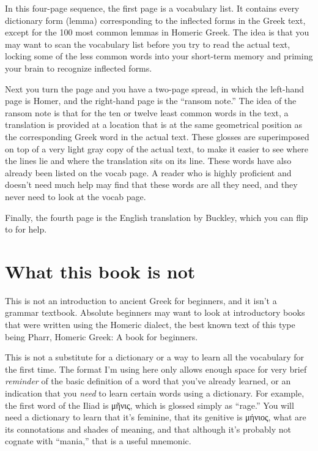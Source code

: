 {In this four-page sequence, the first page is a vocabulary list. It
contains every dictionary form (lemma) corresponding to the inflected
forms in the Greek text, except for the 100 most common lemmas in
Homeric Greek. The idea is that you may want to scan the vocabulary
list before you try to read the actual text, locking some of the less
common words into your short-term memory and priming your brain to
recognize inflected forms.

Next you turn the page and you have a two-page spread, in which the
left-hand page is Homer, and the right-hand page is the ``ransom note.''
The idea of the ransom note is that for the ten or twelve least common
words in the text, a translation is provided at a location that is at
the same geometrical position as the corresponding Greek word in the
actual text. These glosses are superimposed on top of a very light
gray copy of the actual text, to make it easier to see where the lines
lie and where the translation sits on its line. These words have also
already been listed on the vocab page. A reader who is highly
proficient and doesn't need much help may find that these words are
all they need, and they never need to look at the vocab page.

Finally, the fourth page is the English translation by Buckley, which you can flip to for help.

\section*{What this book is not}

This is not an introduction to ancient Greek for beginners, and it isn't a grammar textbook.
Absolute beginners may want to look at introductory books that were written using the Homeric
dialect, the best known text of this type being Pharr, Homeric Greek: A book for beginners.

This is not a substitute for a dictionary or a way to learn all the vocabulary for the first
time. The format I'm using here only allows enough space
for very brief \emph{reminder} of the basic definition of a word that you've already learned,
or an indication that you \emph{need} to learn certain words using a dictionary. For example,
the first word of the Iliad is μῆνις, which is glossed simply as ``rage.'' You will need a
dictionary to learn that it's feminine, that its genitive is μήνιος, what are its connotations
and shades of meaning, and that although it's probably not cognate with ``mania,'' that is a
useful mnemonic.

}
